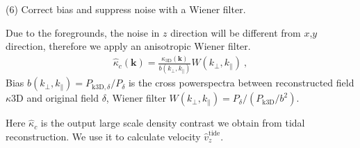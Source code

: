 (6) Correct bias and suppress noise with a Wiener filter.

Due to the foregrounds, the noise in $z$ direction will be different from $x$,$y$ direction, therefore we apply an anisotropic Wiener filter.
\begin{eqnarray}
	\label{eq:wiener}
    \hat \kappa_{c}(\bm{k})=\frac{\kappa_{\mathrm{3D}}(\bm{k})}{b(k_\perp,k_\parallel)}W(k_\perp,k_\parallel)\ ,
\end{eqnarray}
Bias $b(k_\perp,k_\parallel)=P_{\mathrm{k3D,}\delta}/P_\delta$ 
is the cross powerspectra between reconstructed field $\kappa\mathrm{3D}$ and original field $\delta$, 
Wiener filter $W(k_\perp,k_\parallel)=P_\delta/(P_{\mathrm{k3D}}/b^2)$.

Here $\hat \kappa_{c}$ is the output large scale density contrast we obtain from tidal reconstruction.
We use it to calculate velocity $\hat v_z^{\mathrm{tide}}$.
\fi
